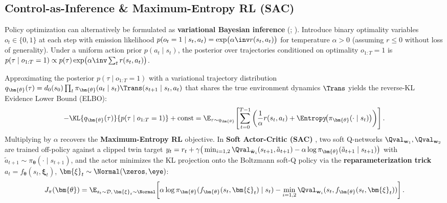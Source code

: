 \documentclass[../../../../master.tex]{subfiles}
\begin{document}
\subsection{Control-as-Inference \& Maximum-Entropy RL (SAC)}

Policy optimization can alternatively be formulated as \textbf{variational Bayesian inference} (; \allowbreak{}). Introduce binary optimality variables $o_t \in \{0, 1\}$ at each step with emission likelihood $p(o_t = 1 \mid s_t, a_t) = \exp\!\big(\alpha\inv r(s_t, a_t)\big)$ for temperature $\alpha > 0$ (assuming $r \le 0$ without loss of generality). Under a uniform action prior $p(a_t \mid s_t)$, the posterior over trajectories conditioned on optimality $o_{1:T} = 1$ is $p(\tau \mid o_{1:T}=1) \propto p(\tau) \exp\!\big(\alpha\inv \sum_t r(s_t, a_t)\big)$.

\begin{coremath}
Approximating the posterior $p(\tau \mid o_{1:T}=1)$ with a variational trajectory distribution $q_{\bm{\theta}}(\tau) = d_0(s_0)\prod_t \pi_{\bm{\theta}}(a_t \mid s_t)\Trans(s_{t+1} \mid s_t, a_t)$ that shares the true environment dynamics $\Trans$ yields the reverse-KL Evidence Lower Bound (ELBO):
\begin{equation}\label{eq:pg:elbo_merl}
  -\KL{q_{\bm{\theta}}(\tau)}{p(\tau \mid o_{1:T}=1)} + \text{const}
  = \E_{\tau \sim q_{\bm{\theta}}}\!\left[ \sum_{t=0}^{T-1} \left( \frac{1}{\alpha} r(s_t, a_t) + \Entropy\!\big(\pi_{\bm{\theta}}(\cdot \mid s_t)\big) \right) \right].
\end{equation}
Multiplying by $\alpha$ recovers the \textbf{Maximum-Entropy RL} objective. In \textbf{Soft Actor-Critic (SAC)} , two soft Q-networks $\Qval_{\mathbf{w}_1}, \Qval_{\mathbf{w}_2}$ are trained off-policy against a clipped twin target $y_t = r_t + \gamma \big(\min_{i=1,2} \Qval_{\bar{\mathbf{w}}_i}(s_{t+1}, \tilde{a}_{t+1}) - \alpha \log \pi_{\bm{\theta}}(\tilde{a}_{t+1} \mid s_{t+1})\big)$ with $\tilde{a}_{t+1} \sim \pi_{\bm{\theta}}(\cdot \mid s_{t+1})$, and the actor minimizes the KL projection onto the Boltzmann soft-Q policy via the \textbf{reparameterization trick} $a_t = f_{\bm{\theta}}(s_t, \bm{\xi}_t)$, $\bm{\xi}_t \sim \Normal(\zeros, \eye)$:
\begin{equation}\label{eq:pg:sac_actor}
  J_\pi(\bm{\theta}) = \E_{s_t \sim \mathcal{D},\, \bm{\xi}_t \sim \Normal}\!\left[ \alpha \log \pi_{\bm{\theta}}(f_{\bm{\theta}}(s_t, \bm{\xi}_t) \mid s_t) - \min_{i=1,2} \Qval_{\mathbf{w}_i}(s_t, f_{\bm{\theta}}(s_t, \bm{\xi}_t)) \right].
\end{equation}
\end{coremath}
\end{document}
